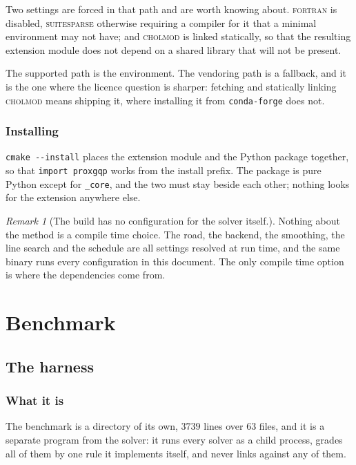 \documentclass[a4paper,11pt]{book}
\theoremstyle{plain}
\theoremstyle{definition}
\theoremstyle{remark}
\newtheorem{remark}[theorem]{Remark}
\numberwithin{equation}{chapter}
\numberwithin{algorithm}{chapter}
\begin{document}
	Two settings are forced in that path and are worth knowing about.
	\textsc{fortran} is disabled, \textsc{suitesparse} otherwise requiring a
	compiler for it that a minimal environment may not have; and \textsc{cholmod}
	is linked statically, so that the resulting extension module does not depend
	on a shared library that will not be present.

	The supported path is the environment. The vendoring path is a fallback, and
	it is the one where the licence question is sharper: fetching and statically
	linking \textsc{cholmod} means shipping it, where installing it from
	\texttt{conda-forge} does not.

	\section{Installing}

	\texttt{cmake -{}-install} places the extension module and the Python package
	together, so that \texttt{import proxgqp} works from the install prefix. The
	package is pure Python except for \texttt{\_core}, and the two must stay
	beside each other; nothing looks for the extension anywhere else.

	\begin{remark}[The build has no configuration for the solver itself.]
		Nothing about the method is a compile time choice. The road, the backend,
		the smoothing, the line search and the schedule are all settings resolved at
		run time, and the same binary runs every configuration in this document. The
		only compile time option is where the dependencies come from.
	\end{remark}

	\part{Benchmark}
	
	
	\chapter{The harness}

	\section{What it is}

	The benchmark is a directory of its own, $3739$ lines over $63$ files, and it
	is a separate program from the solver: it runs every solver as a child
	process, grades all of them by one rule it implements itself, and never links
	against any of them.
\end{document}
